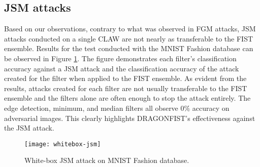 	\subsection{JSM attacks} \label{s:whiteboxattacks:jsm}
		Based on our observations, contrary to what was observed in FGM attacks, JSM attacks conducted on a single CLAW are not nearly as transferable to the FIST ensemble. Results for the test conducted with the MNIST Fashion database \cite{zalandoresearchFashionMNIST} can be observed in Figure \ref{f:whitebox:jsm}. The figure demonstrates each filter's classification accuracy against a JSM attack and the classification accuracy of the attack created for the filter when applied to the FIST ensemble. As evident from the results, attacks created for each filter are not usually transferable to the FIST ensemble and the filters alone are often enough to stop the attack entirely. The edge detection, minimum, and median filters all observe \(0\%\) accuracy on adversarial images. This clearly highlights DRAGONFIST's effectiveness against the JSM attack.
		\begin{figure}
			\texttt{[image: whitebox-jsm]}
			\caption{White-box JSM attack on MNIST Fashion database.}
			\label{f:whitebox:jsm}
		\end{figure}
